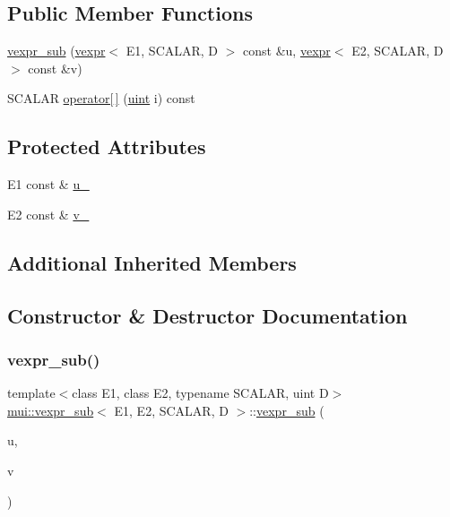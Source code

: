\subsection*{Public Member Functions}
\begin{DoxyCompactItemize}
\item 
\hyperlink{structmui_1_1vexpr__sub_ae3d5d979c09107a61355c8c2a53752e7}{vexpr\+\_\+sub} (\hyperlink{structmui_1_1vexpr}{vexpr}$<$ E1, S\+C\+A\+L\+AR, D $>$ const \&u, \hyperlink{structmui_1_1vexpr}{vexpr}$<$ E2, S\+C\+A\+L\+AR, D $>$ const \&v)
\item 
S\+C\+A\+L\+AR \hyperlink{structmui_1_1vexpr__sub_a7950fc7cf4b9eb4df0a41b2514e9115f}{operator\mbox{[}$\,$\mbox{]}} (\hyperlink{namespacemui_af15a3e7188a2117fb9965277bb0cacd2}{uint} i) const
\end{DoxyCompactItemize}
\subsection*{Protected Attributes}
\begin{DoxyCompactItemize}
\item 
E1 const  \& \hyperlink{structmui_1_1vexpr__sub_a37bc25a35855f8f3fef162505351aab4}{u\+\_\+}
\item 
E2 const  \& \hyperlink{structmui_1_1vexpr__sub_a7edddfe56f2a6dad3104d13e9b5d9e05}{v\+\_\+}
\end{DoxyCompactItemize}
\subsection*{Additional Inherited Members}


\subsection{Constructor \& Destructor Documentation}
\mbox{\label{structmui_1_1vexpr__sub_ae3d5d979c09107a61355c8c2a53752e7}} 
\subsubsection{\texorpdfstring{vexpr\+\_\+sub()}{vexpr\_sub()}}
{\footnotesize\ttfamily template$<$class E1, class E2, typename S\+C\+A\+L\+AR, uint D$>$ \\
\hyperlink{structmui_1_1vexpr__sub}{mui\+::vexpr\+\_\+sub}$<$ E1, E2, S\+C\+A\+L\+AR, D $>$\+::\hyperlink{structmui_1_1vexpr__sub}{vexpr\+\_\+sub} (\begin{DoxyParamCaption}\item[{\hyperlink{structmui_1_1vexpr}{vexpr}$<$ E1, S\+C\+A\+L\+AR, D $>$ const \&}]{u,  }\item[{\hyperlink{structmui_1_1vexpr}{vexpr}$<$ E2, S\+C\+A\+L\+AR, D $>$ const \&}]{v }\end{DoxyParamCaption})\hspace{0.3cm}{\ttfamily [inline]}}



